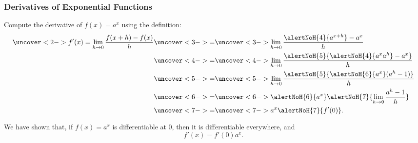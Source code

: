 \begin{frame}
\frametitle{Derivatives of Exponential Functions}
Compute the derivative of $f(x) = a^x$ using the definition:
\begin{align*}
\uncover<2->{f'(x) = \lim_{h\to 0} \frac{f(x+h)-f(x)}{h}} & \uncover<3->{=}  \uncover<3->{\lim_{h\to 0} \frac{\alertNoH{ 4}{a^{x+h}}-a^x}{h}}\\
 & \uncover<4->{=}  \uncover<4->{\lim_{h\to 0} \frac{\alertNoH{ 5}{\alertNoH{ 4}{a^x a^h}-a^x}}{h}}\\
 & \uncover<5->{=}  \uncover<5->{\lim_{h\to 0} \frac{\alertNoH{ 5}{\alertNoH{ 6}{a^x} (a^h- 1)}}{h}}\\
 & \uncover<6->{=}  \uncover<6->{\alertNoH{ 6}{a^x} \alertNoH{ 7}{\lim_{h\to 0} \frac{a^h- 1}{h}}}\\
 & \uncover<7->{=}  \uncover<7->{a^x \alertNoH{ 7}{f'(0)}.}
\end{align*}
\end{frame}


\begin{frame}
We have shown that, if $f(x) = a^x$ is differentiable at 0, then it is differentiable everywhere, and
\[
f'(x) = f'(0)a^x .
\]
\end{frame}
